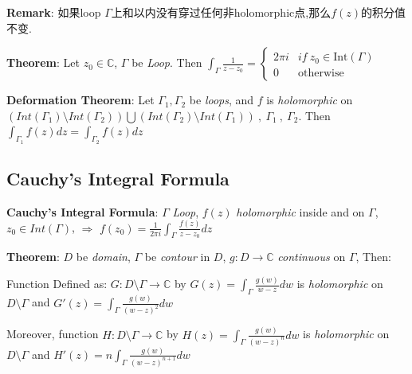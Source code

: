 \documentclass[9pt]{article}
\begin{document}
\quad \textbf{Remark}: {\small 如果loop $\Gamma$上和以内没有穿过任何非holomorphic点,那么$f(z)$的积分值不变.}

\textbf{Theorem}: Let $z_0\in\mathbb{C}$, $\Gamma$ be \textit{Loop}. Then $\int_\Gamma \frac{1}{z-z_0}=\begin{cases}2\pi i & if \ z_0\in\text{Int}(\Gamma) \\ 0 & \text{otherwise} \end{cases}$

\textbf{Deformation Theorem}: {\footnotesize Let $\Gamma_1,\Gamma_2$ be \textit{loops}, and $f$ is \textit{holomorphic} on $\left(Int(\Gamma_1)\setminus Int(\Gamma_2)\right)\bigcup\left(Int(\Gamma_2)\setminus Int(\Gamma_1)\right) \ , \ \Gamma_1 \ , \ \Gamma_2$. Then $\int_{\Gamma_1}f(z)dz=\int_{\Gamma_2}f(z)dz$}

 


\subsection{Cauchy's Integral Formula} %

\textbf{Cauchy's Integral Formula}: $\Gamma$ \textit{Loop}, $f(z)$ \textit{holomorphic} inside and on $\Gamma$, $z_0\in Int(\Gamma)$, \quad $\Rightarrow$ \quad $f(z_0)=\frac{1}{2\pi i}\int_{\Gamma}\frac{f(z)}{z-z_0}dz$


\textbf{Theorem}: $D$ be \textit{domain}, $\Gamma$ be \textit{contour} in $D$, $g:D\to\mathbb{C}$ \textit{continuous} on $\Gamma$, Then:

\hspace{46pt} Function Defined as: $G:D\setminus\Gamma\to\mathbb{C}$ by \quad $G(z)=\int_{\Gamma}\frac{g(w)}{w-z}dw$ is \textit{holomorphic} on $D\setminus\Gamma$ \quad and \quad $G'(z)=\int_{\Gamma}\frac{g(w)}{(w-z)^2}dw$

\hspace{46pt} Moreover, function $H:D\setminus\Gamma\to\mathbb{C}$ by \quad $H(z)=\int_{\Gamma}\frac{g(w)}{(w-z)^n}dw$ is \textit{holomorphic} on $D\setminus\Gamma$ \quad and \quad $H'(z)=n\int_{\Gamma}\frac{g(w)}{(w-z)^{n+1}}dw$
\end{document}
